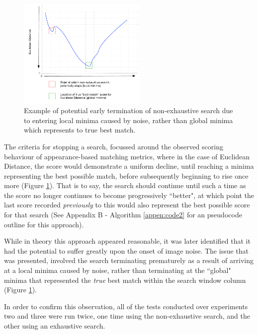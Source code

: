 \begin{figure}
\vspace{-20pt}
  \begin{center}
    \includegraphics[width=0.55\textwidth]{images/ed.pdf}
  \end{center}
  \vspace{-10pt}
  \caption{Example of potential early termination of non-exhaustive search due to entering local minima caused by noise, rather than global minima which represents to true best match.}
     \label{fig:ed}
  \vspace{-10pt}
\end{figure}

The criteria for stopping a search, focussed around the observed scoring behaviour of appearance-based matching metrics, where in the case of Euclidean Distance, the score would demonstrate a uniform decline, until reaching a minima representing the best possible match, before subsequently beginning to rise once more (Figure \ref{fig:ed}). That is to say, the search should continue until such a time as the score no longer continues to become progressively ``better", at which point the last score recorded \textit{previously} to this would also represent the best possible score for that search (See Appendix B - Algorithm \ref{appen:code2} for an pseudocode outline for this approach).

While in theory this approach appeared reasonable, it was later identified that it had the potential to suffer greatly upon the onset of image noise. The issue that was presented, involved the search terminating prematurely as a result of arriving at a local minima caused by noise, rather than terminating at the ``global" minima that represented the \textit{true} best match within the search window column (Figure \ref{fig:ed}). 

In order to confirm this observation, all of the tests conducted over experiments two and three were run twice, one time using the non-exhaustive search, and the other using an exhaustive search.


